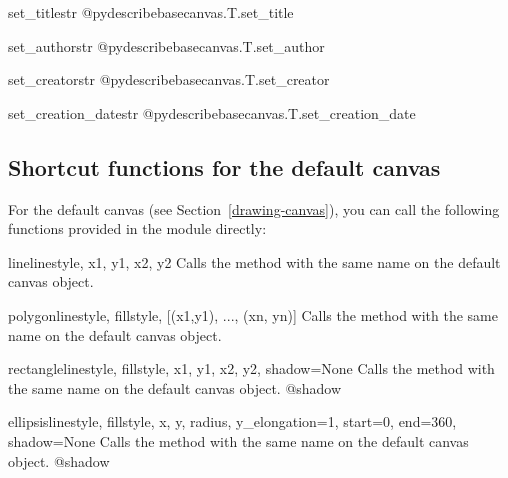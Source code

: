 \documentclass{howto}
\newcommand{\pxref}[1]{see Section~\ref{#1}}
\begin{document}
\begin{methoddesc}{set_title}{str}
@pydescribe{basecanvas.T.set_title}
\end{methoddesc}

\begin{methoddesc}{set_author}{str}
@pydescribe{basecanvas.T.set_author}
\end{methoddesc}

\begin{methoddesc}{set_creator}{str}
@pydescribe{basecanvas.T.set_creator}
\end{methoddesc}

\begin{methoddesc}{set_creation_date}{str}
@pydescribe{basecanvas.T.set_creation_date}
\end{methoddesc}

\subsection{Shortcut functions for the default canvas}\label{default-canvas}

For the default canvas (\pxref{drawing-canvas}), you can call the
following functions provided in the  module directly:

\begin{funcdesc}{line}{linestyle, x1, y1, x2, y2}
Calls the method with the same name on the default canvas object.
\end{funcdesc}

\begin{funcdesc}{polygon}{linestyle, fillstyle, [(x1,y1), ..., (xn, yn)]}
Calls the method with the same name on the default canvas object.
\end{funcdesc}

\begin{funcdesc}{rectangle}{linestyle, fillstyle, x1, y1, x2, y2, shadow=None}
Calls the method with the same name on the default canvas object.
@shadow
\end{funcdesc}

\begin{funcdesc}{ellipsis}{linestyle, fillstyle, x, y, radius, y_elongation=1, start=0, end=360, shadow=None}
Calls the method with the same name on the default canvas object.
@shadow
\end{funcdesc}
\end{document}
